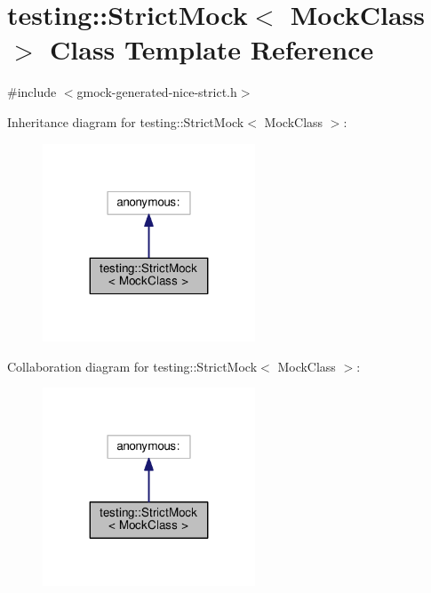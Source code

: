 \hypertarget{classtesting_1_1StrictMock}{}\section{testing\+:\+:Strict\+Mock$<$ Mock\+Class $>$ Class Template Reference}
\label{classtesting_1_1StrictMock}


{\ttfamily \#include $<$gmock-\/generated-\/nice-\/strict.\+h$>$}



Inheritance diagram for testing\+:\+:Strict\+Mock$<$ Mock\+Class $>$\+:
\nopagebreak
\begin{figure}[H]
\begin{center}
\leavevmode
\includegraphics[width=179pt]{classtesting_1_1StrictMock__inherit__graph}
\end{center}
\end{figure}


Collaboration diagram for testing\+:\+:Strict\+Mock$<$ Mock\+Class $>$\+:
\nopagebreak
\begin{figure}[H]
\begin{center}
\leavevmode
\includegraphics[width=179pt]{classtesting_1_1StrictMock__coll__graph}
\end{center}
\end{figure}

